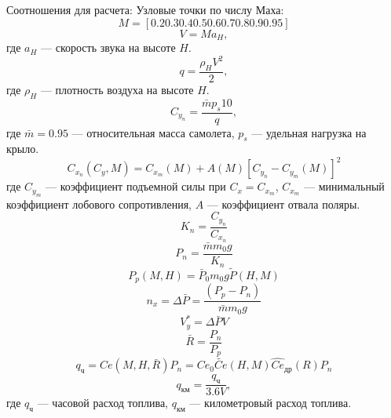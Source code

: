 Соотношения для расчета:
Узловые точки по числу Маха:
\[
    M = [0.2 0.3 0.4 0.5 0.6 0.7 0.8 0.9 0.95]
\]
\begin{equation}
    V = M a_H,
    \label{eq:V_speed}
\end{equation}
где $a_H$ --- скорость звука на высоте $H$.
\begin{equation}
    q = \frac{\rho_H V^2}{2},
    \label{eq:q_value}
\end{equation}
где $\rho_H$ --- плотность воздуха на высоте $H$.
\begin{equation}
    C_{y_n} = \frac{\bar{m} p_s 10}{q},
    \label{eq:c_y_n}
\end{equation}
где $\bar{m} = 0.95$ --- относительная масса самолета, $p_s$ --- удельная 
нагрузка на крыло.
\begin{equation}
    C_{x_n}(C_y, M) = C_{x_m}(M) + A(M) \left[ C_{y_n} - C_{y_m}(M)\right]^2
    \label{eq:c_x_n}
\end{equation}
где $C_{y_m}$ --- коэффициент подъемной силы при $C_x = C_{x_m}$, $C_{x_m}$ ---
минимальный коэффициент лобового сопротивления, $A$ --- коэффициент отвала
поляры.
\begin{equation}
    K_n = \frac{C_{y_n}}{C_{x_n}}
    \label{eq:K_n}
\end{equation}
\begin{equation}
    P_n = \frac{\bar{m} m_0 g}{K_n}
    \label{eq:P_potr}
\end{equation}
\begin{equation}
    P_p(M,H) = \bar{P}_0 m_0 g \tilde{P}(H,M)
    \label{eq:P_rasp}
\end{equation}
\begin{equation}
    n_x = \Delta \bar{P} = \frac{(P_p - P_n)}{\bar{m} m_0 g}
    \label{eq:n_x}
\end{equation}
\begin{equation}
    V_y^* = \Delta \bar{P} V
    \label{eq:Vy}
\end{equation}
\begin{equation}
    \bar{R} = \frac{P_n}{P_p}
    \label{eq:R_dross}
\end{equation}
\begin{equation}
    q_{ч} = Ce(M,H,\bar{R})P_n = Ce_0 \tilde{Ce}(H,M) \hat{Ce}_{др}(R) P_n
    \label{eq:q_chas}
\end{equation}
\begin{equation}
    q_{км} = \frac{q_{ч}}{3.6V},
    \label{eq:q_km}
\end{equation}
где $q_{ч}$ --- часовой расход топлива, $q_{км}$ --- километровый расход топлива.




